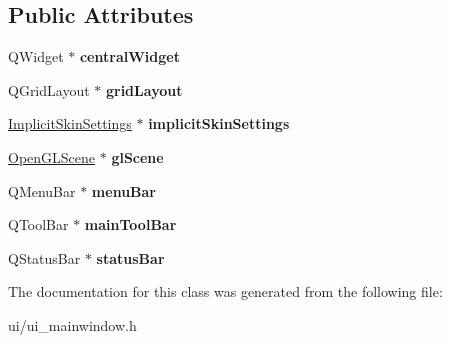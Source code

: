 \subsection*{Public Attributes}
\begin{DoxyCompactItemize}
\item 
Q\+Widget $\ast$ {\bfseries central\+Widget}\hypertarget{classUi__MainWindow_a30075506c2116c3ed4ff25e07ae75f81}{}\label{classUi__MainWindow_a30075506c2116c3ed4ff25e07ae75f81}

\item 
Q\+Grid\+Layout $\ast$ {\bfseries grid\+Layout}\hypertarget{classUi__MainWindow_a525ed3c5fe0784ac502ee222fba4e205}{}\label{classUi__MainWindow_a525ed3c5fe0784ac502ee222fba4e205}

\item 
\hyperlink{classImplicitSkinSettings}{Implicit\+Skin\+Settings} $\ast$ {\bfseries implicit\+Skin\+Settings}\hypertarget{classUi__MainWindow_ad0e50dae1ab8b5118ddecf682a226e18}{}\label{classUi__MainWindow_ad0e50dae1ab8b5118ddecf682a226e18}

\item 
\hyperlink{classOpenGLScene}{Open\+G\+L\+Scene} $\ast$ {\bfseries gl\+Scene}\hypertarget{classUi__MainWindow_a57f629a009e0e3c53e790a4ce9f5a2d3}{}\label{classUi__MainWindow_a57f629a009e0e3c53e790a4ce9f5a2d3}

\item 
Q\+Menu\+Bar $\ast$ {\bfseries menu\+Bar}\hypertarget{classUi__MainWindow_a2be1c24ec9adfca18e1dcc951931457f}{}\label{classUi__MainWindow_a2be1c24ec9adfca18e1dcc951931457f}

\item 
Q\+Tool\+Bar $\ast$ {\bfseries main\+Tool\+Bar}\hypertarget{classUi__MainWindow_a5172877001c8c7b4e0f6de50421867d1}{}\label{classUi__MainWindow_a5172877001c8c7b4e0f6de50421867d1}

\item 
Q\+Status\+Bar $\ast$ {\bfseries status\+Bar}\hypertarget{classUi__MainWindow_a50fa481337604bcc8bf68de18ab16ecd}{}\label{classUi__MainWindow_a50fa481337604bcc8bf68de18ab16ecd}

\end{DoxyCompactItemize}


The documentation for this class was generated from the following file\+:\begin{DoxyCompactItemize}
\item 
ui/ui\+\_\+mainwindow.\+h\end{DoxyCompactItemize}
